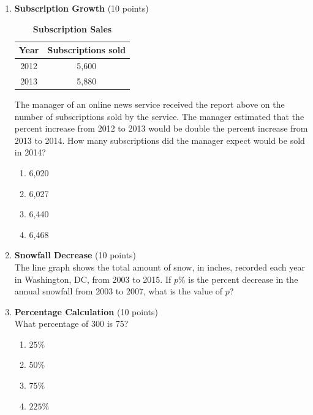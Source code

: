 \begin{enumerate}
  \item \textbf{Subscription Growth} (10 points)\\
  \begin{table}[h!]
  \centering
  \renewcommand{\arraystretch}{1.3}
  \setlength{\tabcolsep}{8pt}
  \caption*{\textbf{Subscription Sales}}
  \begin{tabular}{|c|c|}
  \hline
  \rowcolor[HTML]{E0E0E0}
  \textbf{Year} & \textbf{Subscriptions sold} \\
  \hline
  2012 & 5,600 \\
  \hline
  2013 & 5,880 \\
  \hline
  \end{tabular}
  \end{table}
  The manager of an online news service received the report above on the number of subscriptions sold by the service. The manager estimated that the percent increase from 2012 to 2013 would be double the percent increase from 2013 to 2014. How many subscriptions did the manager expect would be sold in 2014?
  \begin{enumerate}[label=(\Alph*)]
    \item 6,020
    \item 6,027
    \item 6,440
    \item 6,468
  \end{enumerate}
  \begin{subanswer}
  \end{subanswer}

  \newpage

  \item \textbf{Snowfall Decrease} (10 points)\\
  The line graph shows the total amount of snow, in inches, recorded each year in Washington, DC, from 2003 to 2015. If $p\%$ is the percent decrease in the annual snowfall from 2003 to 2007, what is the value of $p$?
  \begin{subanswer}
  \end{subanswer}

  \item \textbf{Percentage Calculation} (10 points)\\
  What percentage of 300 is 75?
  \begin{enumerate}[label=(\Alph*)]
    \item $25\%$
    \item $50\%$
    \item $75\%$
    \item $225\%$
  \end{enumerate}
  \begin{subanswer}
  \end{subanswer}


\end{enumerate}
